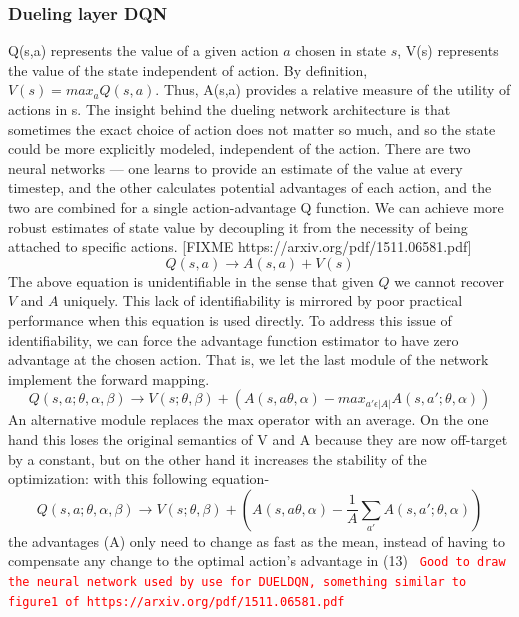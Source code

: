 \subsubsection{Dueling layer DQN}
Q(s,a) represents the value of a given action $a$ chosen in state $s$, V(s) represents the value of the state independent of action. By definition, $V(s)=max_{a}Q(s,a)$. Thus, A(s,a) provides a relative measure of the utility of actions in s. The insight behind the dueling network architecture is that sometimes the exact choice of action does not matter so much, and so the state could be more explicitly modeled, independent of the action. There are two neural networks — one learns to provide an estimate of the value at every timestep, and the other calculates potential advantages of each action, and the two are combined for a single action-advantage Q function. We can achieve more robust estimates of state value by decoupling it from the necessity of being attached to specific actions.
 [FIXME https://arxiv.org/pdf/1511.06581.pdf]
\newline
\begin{equation}
Q(s,a) \rightarrow A(s,a) + V(s)
\end{equation}
The above equation is unidentifiable in the sense that given $Q$
we cannot recover $V$ and $A$ uniquely. This lack of identifiability is mirrored by poor practical performance when this equation is used directly. To address this issue of identifiability, we can force the advantage
function estimator to have zero advantage at the
chosen action. That is, we let the last module of the network
implement the forward mapping.
\begin{equation}
Q(s,a; \theta, \alpha, \beta) \rightarrow V(s; \theta, \beta) + (A(s,a\theta, \alpha) - max_{a' \epsilon |A|} A(s,a';\theta,\alpha ))
\end{equation}
An alternative module replaces the max operator with an
average. On the one hand this loses the original semantics of V and
A because they are now off-target by a constant, but on
the other hand it increases the stability of the optimization:
with this following equation-
\begin{equation}
Q(s,a; \theta, \alpha, \beta) \rightarrow V(s; \theta, \beta) + (A(s,a\theta, \alpha) - \frac{1}{A} \sum_{a'}^{} A(s,a';\theta,\alpha ))
\end{equation}
 the advantages (A) only need to change as fast as the
mean, instead of having to compensate any change to the
optimal action’s advantage in  (13)
\newline
 \textcolor{red}{\texttt{ Good to draw the neural network used by use for DUELDQN, something similar to figure1 of https://arxiv.org/pdf/1511.06581.pdf }}
 
